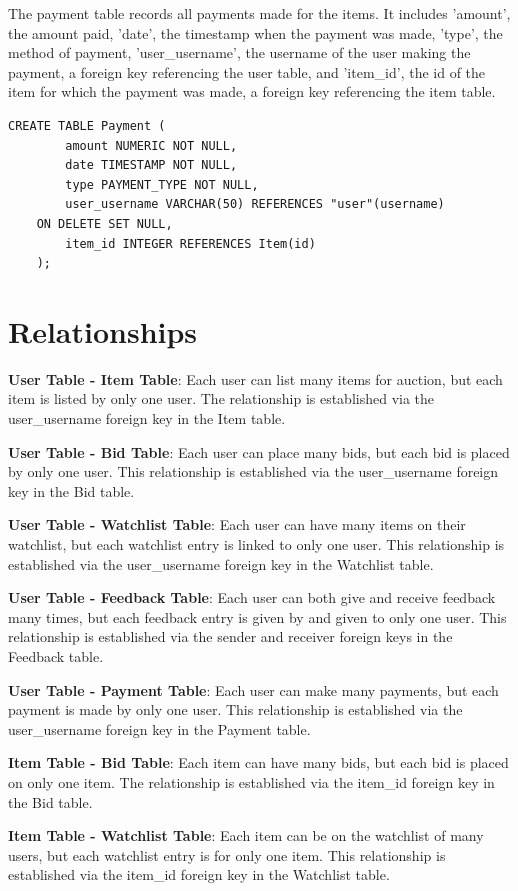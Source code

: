 The payment table records all payments made for the items. It includes 'amount', the amount paid, 'date', the timestamp when the payment was made, 'type', the method of payment, 'user\_username', the username of the user making the payment, a foreign key referencing the user table, and 'item\_id', the id of the item for which the payment was made, a foreign key referencing the item table.

\vspace{0.2cm}
\begin{lstlisting}[style=sqlStyle]
	CREATE TABLE Payment (
		amount NUMERIC NOT NULL,
		date TIMESTAMP NOT NULL,
		type PAYMENT_TYPE NOT NULL,
		user_username VARCHAR(50) REFERENCES "user"(username)
	ON DELETE SET NULL,
		item_id INTEGER REFERENCES Item(id)
	);
\end{lstlisting}


\section{Relationships}
\textbf{User Table - Item Table}: Each user can list many items for auction, but each item is listed by only one user. The relationship is established via the user\_username foreign key in the Item table.

\textbf{User Table - Bid Table}: Each user can place many bids, but each bid is placed by only one user. This relationship is established via the user\_username foreign key in the Bid table.

\textbf{User Table - Watchlist Table}: Each user can have many items on their watchlist, but each watchlist entry is linked to only one user. This relationship is established via the user\_username foreign key in the Watchlist table.

\textbf{User Table - Feedback Table}: Each user can both give and receive feedback many times, but each feedback entry is given by and given to only one user. This relationship is established via the sender and receiver foreign keys in the Feedback table.

\textbf{User Table - Payment Table}: Each user can make many payments, but each payment is made by only one user. This relationship is established via the user\_username foreign key in the Payment table.

\textbf{Item Table - Bid Table}: Each item can have many bids, but each bid is placed on only one item. The relationship is established via the item\_id foreign key in the Bid table.

\textbf{Item Table - Watchlist Table}: Each item can be on the watchlist of many users, but each watchlist entry is for only one item. This relationship is established via the item\_id foreign key in the Watchlist table.


